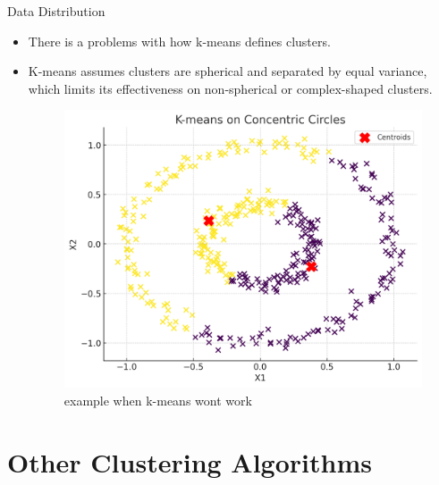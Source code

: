 \documentclass[serif, aspectratio=169]{beamer}
\begin{document}
\begin{frame}{Data Distribution}
    \begin{itemize}
        \item There is a problems with how k-means defines clusters.
        \item  K-means assumes clusters are spherical and separated by equal variance, which limits its effectiveness on non-spherical or complex-shaped clusters.
    \begin{figure}
        \centering
        \includegraphics[scale=0.35]{pic/figs/kmeans_anti.png}
        \caption{example when k-means wont work}
    \end{figure}

    \end{itemize}
\end{frame}


\section{Other Clustering Algorithms}
\end{document}
